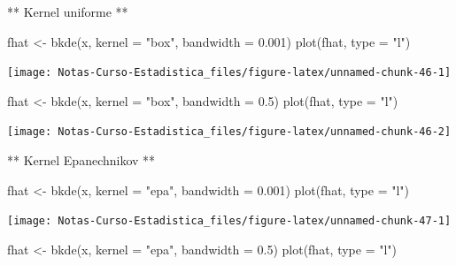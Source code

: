 \documentclass[
  12pt,
]{book}
\newenvironment{Shaded}{\begin{snugshade}}{\end{snugshade}}
\newcommand{\AttributeTok}[1]{\textcolor[rgb]{0.77,0.63,0.00}{#1}}
\newcommand{\FloatTok}[1]{\textcolor[rgb]{0.00,0.00,0.81}{#1}}
\newcommand{\FunctionTok}[1]{\textcolor[rgb]{0.00,0.00,0.00}{#1}}
\newcommand{\NormalTok}[1]{#1}
\newcommand{\OtherTok}[1]{\textcolor[rgb]{0.56,0.35,0.01}{#1}}
\newcommand{\StringTok}[1]{\textcolor[rgb]{0.31,0.60,0.02}{#1}}
\theoremstyle{definition}
\theoremstyle{definition}
\theoremstyle{definition}
\theoremstyle{definition}
\theoremstyle{remark}
\begin{document}
** Kernel uniforme **

\begin{Shaded}
\begin{Highlighting}[]
\NormalTok{fhat }\OtherTok{\textless{}{-}} \FunctionTok{bkde}\NormalTok{(x, }\AttributeTok{kernel =} \StringTok{"box"}\NormalTok{, }\AttributeTok{bandwidth =} \FloatTok{0.001}\NormalTok{)}
\FunctionTok{plot}\NormalTok{(fhat, }\AttributeTok{type =} \StringTok{"l"}\NormalTok{)}
\end{Highlighting}
\end{Shaded}

\begin{center}\texttt{[image: Notas-Curso-Estadistica\_files/figure-latex/unnamed-chunk-46-1]} \end{center}

\begin{Shaded}
\begin{Highlighting}[]
\NormalTok{fhat }\OtherTok{\textless{}{-}} \FunctionTok{bkde}\NormalTok{(x, }\AttributeTok{kernel =} \StringTok{"box"}\NormalTok{, }\AttributeTok{bandwidth =} \FloatTok{0.5}\NormalTok{)}
\FunctionTok{plot}\NormalTok{(fhat, }\AttributeTok{type =} \StringTok{"l"}\NormalTok{)}
\end{Highlighting}
\end{Shaded}

\begin{center}\texttt{[image: Notas-Curso-Estadistica\_files/figure-latex/unnamed-chunk-46-2]} \end{center}

** Kernel Epanechnikov **

\begin{Shaded}
\begin{Highlighting}[]
\NormalTok{fhat }\OtherTok{\textless{}{-}} \FunctionTok{bkde}\NormalTok{(x, }\AttributeTok{kernel =} \StringTok{"epa"}\NormalTok{, }\AttributeTok{bandwidth =} \FloatTok{0.001}\NormalTok{)}
\FunctionTok{plot}\NormalTok{(fhat, }\AttributeTok{type =} \StringTok{"l"}\NormalTok{)}
\end{Highlighting}
\end{Shaded}

\begin{center}\texttt{[image: Notas-Curso-Estadistica\_files/figure-latex/unnamed-chunk-47-1]} \end{center}

\begin{Shaded}
\begin{Highlighting}[]
\NormalTok{fhat }\OtherTok{\textless{}{-}} \FunctionTok{bkde}\NormalTok{(x, }\AttributeTok{kernel =} \StringTok{"epa"}\NormalTok{, }\AttributeTok{bandwidth =} \FloatTok{0.5}\NormalTok{)}
\FunctionTok{plot}\NormalTok{(fhat, }\AttributeTok{type =} \StringTok{"l"}\NormalTok{)}
\end{Highlighting}
\end{Shaded}
\end{document}
